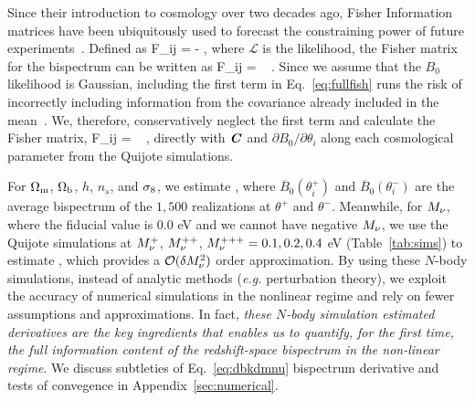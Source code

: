 Since their introduction to cosmology over two decades ago, Fisher Information 
matrices have been ubiquitously used to forecast the constraining power of future 
experiments~\citep[\emph{e.g.}][]{jungman1996,tegmark1997,dodelson2003,heavens2009,verde2010}. 
Defined as 
\beq 
F_{ij} = - \bigg \langle {} \bigg \rangle,
\eeq
where $\mathcal{L}$ is the likelihood, the Fisher matrix for the bispectrum can 
be written as 
\beq \label{eq:fullfish} 
F_{ij} = ~ .
\eeq
Since we assume that the $B_0$ likelihood is Gaussian, including the first 
term in Eq.~\ref{eq:fullfish} runs the risk of incorrectly including information 
from the covariance already included in the mean~\citep{carron2013}. We, therefore,
conservatively neglect the first term and calculate the Fisher matrix, 
\beq \label{eq:fisher}
F_{ij} = ~ ,
\eeq
directly with $\textbf{\textit{C}}$ and $\partial B_0/\partial \theta_i$ along each cosmological 
parameter from the Quijote simulations. 

For $\Omega_{\rm m}$, $\Omega_{\rm b}$, $h$, $n_s$, and $\sigma_8$, we estimate 
\beq \label{eq:dbkdt} 
 \approx {}, 
\eeq
where $\overline{B}_0(\theta_i^{+})$ and $\overline{B}_0(\theta_i^{-})$ are 
the average bispectrum of the $1,500$ realizations at $\theta^{+}$ and $\theta^{-}$. 
Meanwhile, for $M_\nu$, where the fiducial value is 0.0 eV and we cannot have 
negative $M_\nu$, we use the Quijote simulations at $M_\nu^+$, $M_\nu^{++}$, 
$M_\nu^{+++}=0.1, 0.2, 0.4$ eV (Table~\ref{tab:sims}) to estimate 
\beq \label{eq:dbkdmnu} 
 \approx {}, 
\eeq
which provides a $\mathcal{O}(\delta M_\nu^2)$ order approximation. By using these 
$N$-body simulations, instead of analytic methods (\emph{e.g.} perturbation theory), 
we exploit the accuracy of numerical simulations in the nonlinear regime and rely on 
fewer assumptions and approximations. In fact, \emph{these $N$-body simulation estimated 
derivatives are the key ingredients that enables us to quantify, for the first time, 
the full information content of the redshift-space bispectrum in the non-linear regime}. 
We discuss subtleties of Eq.~\ref{eq:dbkdmnu} bispectrum derivative and tests of 
convegence in Appendix~\ref{sec:numerical}. 

